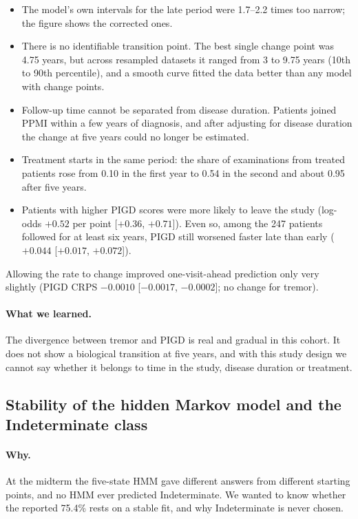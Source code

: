 \documentclass[11pt,a4paper]{article}
\begin{document}
\begin{itemize}
  \item The model's own intervals for the late period were 1.7--2.2 times too
        narrow; the figure shows the corrected ones.
  \item There is no identifiable transition point. The best single change point
        was 4.75 years, but across resampled datasets it ranged from 3 to 9.75
        years (10th to 90th percentile), and a smooth curve fitted the data
        better than any model with change points.
  \item Follow-up time cannot be separated from disease duration. Patients
        joined PPMI within a few years of diagnosis, and after adjusting for
        disease duration the change at five years could no longer be estimated.
  \item Treatment starts in the same period: the share of examinations from
        treated patients rose from 0.10 in the first year to 0.54 in the second
        and about 0.95 after five years.
  \item Patients with higher PIGD scores were more likely to leave the study
        (log-odds $+0.52$ per point [$+0.36$, $+0.71$]). Even so, among the 247
        patients followed for at least six years, PIGD still worsened faster
        late than early ($+0.044$ [$+0.017$, $+0.072$]).
\end{itemize}

Allowing the rate to change improved one-visit-ahead prediction only very
slightly (PIGD CRPS $-0.0010$ [$-0.0017$, $-0.0002$]; no change for tremor).

\paragraph{What we learned.} The divergence between tremor and PIGD is real and
gradual in this cohort. It does not show a biological transition at five years,
and with this study design we cannot say whether it belongs to time in the
study, disease duration or treatment.

\subsection{Stability of the hidden Markov model and the Indeterminate class}

\paragraph{Why.} At the midterm the five-state HMM gave different answers from
different starting points, and no HMM ever predicted Indeterminate. We wanted
to know whether the reported 75.4\% rests on a stable fit, and why
Indeterminate is never chosen.
\end{document}

